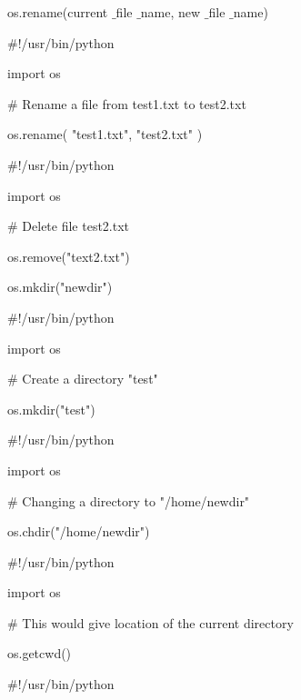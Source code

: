 \vspace{14pt}
\noindent 
os.rename(current $  \_  $file $  \_  $name, new $  \_  $file $  \_  $name) \par
\vspace{14pt}
\noindent 
 $  \#  $!/usr/bin/python \par
\noindent 
import os \par
\vspace{12pt}
\noindent 
 $  \#  $ Rename a file from test1.txt to test2.txt \par
\noindent 
os.rename( "test1.txt", "test2.txt" ) \par
\vspace{14pt}
\noindent 
 $  \#  $!/usr/bin/python \par
\noindent 
import os \par
\vspace{12pt}
\noindent 
 $  \#  $ Delete file test2.txt \par
\noindent 
os.remove("text2.txt") \par
\vspace{14pt}
\noindent 
os.mkdir("newdir") \par
\vspace{14pt}
\noindent 
 $  \#  $!/usr/bin/python \par
\noindent 
import os \par
\vspace{12pt}
\noindent 
 $  \#  $ Create a directory "test" \par
\noindent 
os.mkdir("test") \par
\vspace{14pt}
\noindent 
 $  \#  $!/usr/bin/python \par
\noindent 
import os \par
\vspace{12pt}
\noindent 
 $  \#  $ Changing a directory to "/home/newdir" \par
\noindent 
os.chdir("/home/newdir") \par
\vspace{14pt}
\noindent 
 $  \#  $!/usr/bin/python \par
\noindent 
import os \par
\vspace{12pt}
\noindent 
 $  \#  $ This would give location of the current directory \par
\noindent 
os.getcwd() \par
\vspace{14pt}
\noindent 
 $  \#  $!/usr/bin/python \par
